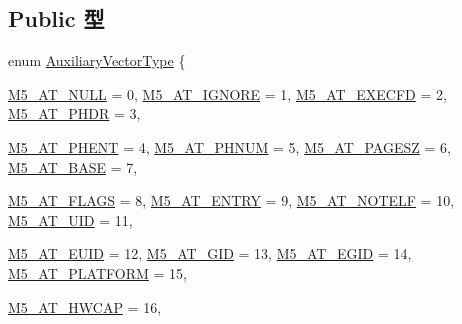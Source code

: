 \subsection*{Public 型}
\begin{DoxyCompactItemize}
\item 
enum \hyperlink{classLiveProcess_aeb4aa6d635512df433c7194b793c349a}{AuxiliaryVectorType} \{ \par
\hyperlink{classLiveProcess_aeb4aa6d635512df433c7194b793c349aa93d3713d59d605b86574b623e4242212}{M5\_\-AT\_\-NULL} =  0, 
\hyperlink{classLiveProcess_aeb4aa6d635512df433c7194b793c349aa39b6bdaacb7fa9afb24adc5ccfcde7cd}{M5\_\-AT\_\-IGNORE} =  1, 
\hyperlink{classLiveProcess_aeb4aa6d635512df433c7194b793c349aa84871b59fa21cf859fcb0e26b5870697}{M5\_\-AT\_\-EXECFD} =  2, 
\hyperlink{classLiveProcess_aeb4aa6d635512df433c7194b793c349aa36f48f6eb495284ebf5d1b941c66b848}{M5\_\-AT\_\-PHDR} =  3, 
\par
\hyperlink{classLiveProcess_aeb4aa6d635512df433c7194b793c349aa9c38dbe22c973257e5d54221bc7f7064}{M5\_\-AT\_\-PHENT} =  4, 
\hyperlink{classLiveProcess_aeb4aa6d635512df433c7194b793c349aa74b22be1b0b521d3e5ed1fb1d350a70e}{M5\_\-AT\_\-PHNUM} =  5, 
\hyperlink{classLiveProcess_aeb4aa6d635512df433c7194b793c349aadc94818dfb2bcdce8d734edb2dd84b21}{M5\_\-AT\_\-PAGESZ} =  6, 
\hyperlink{classLiveProcess_aeb4aa6d635512df433c7194b793c349aa369cb0a7cd29fd54cd60406f0ba0dc95}{M5\_\-AT\_\-BASE} =  7, 
\par
\hyperlink{classLiveProcess_aeb4aa6d635512df433c7194b793c349aa3f73157f68676f6ed47d0435afaca5b1}{M5\_\-AT\_\-FLAGS} =  8, 
\hyperlink{classLiveProcess_aeb4aa6d635512df433c7194b793c349aacd1785932da86fe7b1e720333108129f}{M5\_\-AT\_\-ENTRY} =  9, 
\hyperlink{classLiveProcess_aeb4aa6d635512df433c7194b793c349aadd1b0590175c0b19cb67111dfb42ef2a}{M5\_\-AT\_\-NOTELF} =  10, 
\hyperlink{classLiveProcess_aeb4aa6d635512df433c7194b793c349aa49db1e20ea3cb0fc497505fde04a8d15}{M5\_\-AT\_\-UID} =  11, 
\par
\hyperlink{classLiveProcess_aeb4aa6d635512df433c7194b793c349aa029d064e22c49f3b6a88e57dfaeb4088}{M5\_\-AT\_\-EUID} =  12, 
\hyperlink{classLiveProcess_aeb4aa6d635512df433c7194b793c349aa1a906102f77c4e798e34f7141947f378}{M5\_\-AT\_\-GID} =  13, 
\hyperlink{classLiveProcess_aeb4aa6d635512df433c7194b793c349aa56daba51d843a9826902813c6479bc31}{M5\_\-AT\_\-EGID} =  14, 
\hyperlink{classLiveProcess_aeb4aa6d635512df433c7194b793c349aa01850afee5ccb341118fa947def7faf2}{M5\_\-AT\_\-PLATFORM} =  15, 
\par
\hyperlink{classLiveProcess_aeb4aa6d635512df433c7194b793c349aad6e66930f88d3e1a0c2c51f3f90f1851}{M5\_\-AT\_\-HWCAP} =  16, 

\end{DoxyCompactItemize}
